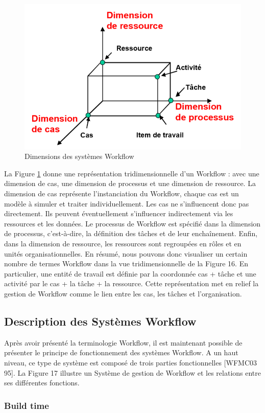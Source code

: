 	 
\begin{figure}[h]
	\centering
	\includegraphics[width=0.5\linewidth]{images/DimensionsWF}
	\caption{ Dimensions des systèmes Workflow }
	\label{fig:dimensionswf}
\end{figure}
 	 La Figure \ref{fig:dimensionswf} donne une représentation tridimensionnelle d’un Workflow : avec une dimension de cas, une dimension de processus et une dimension de ressource. La dimension de cas représente l’instanciation du Workflow, chaque cas est un modèle à simuler et traiter individuellement. Les cas ne s’influencent donc pas directement. Ils peuvent éventuellement s’influencer indirectement via les ressources et les données. Le processus de Workflow est spécifié dans la dimension de processus, c’est-à-dire, la définition des tâches et de leur enchaînement. Enfin, dans la dimension de ressource, les ressources sont regroupées en rôles et en unités organisationnelles. En résumé, nous pouvons donc visualiser un certain nombre de termes Workflow dans la vue tridimensionnelle de la Figure 16. En particulier, une entité de travail est définie par la coordonnée cas + tâche et une activité par le cas + la tâche + la ressource. Cette représentation met en relief la gestion de Workflow comme le lien entre les cas, les tâches et l’organisation. 
 	 
 	 \subsection{Description des Systèmes Workflow }
 	 Après avoir présenté la terminologie Workflow, il est maintenant possible de présenter le principe de fonctionnement des systèmes Workflow. A un haut niveau, ce type de système est composé de trois parties fonctionnelles [WFMC03 95]. La Figure 17 illustre un Système de gestion de Workflow et les relations entre ses différentes fonctions. 
 	 
 	 
 	 
 	 
 	 \subsubsection{ Build time }
 	 
